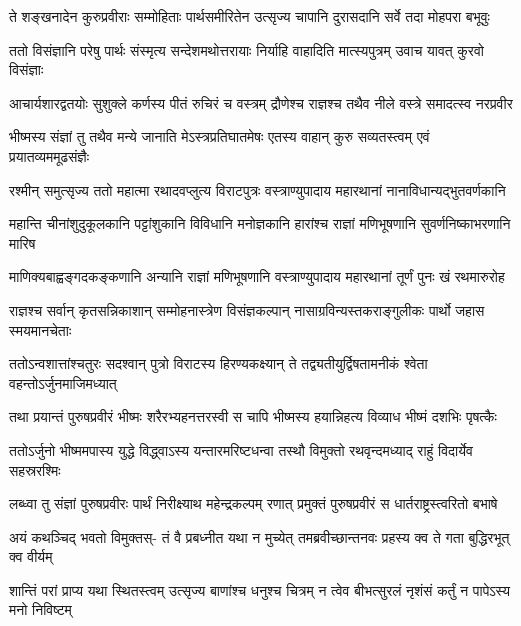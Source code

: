 \fourlineindentedshloka
{ते शङ्खनादेन कुरुप्रवीराः}
{सम्मोहिताः पार्थसमीरितेन}
{उत्सृज्य चापानि दुरासदानि}
{सर्वे तदा मोहपरा बभूवुः}


\fourlineindentedshloka
{ततो विसंज्ञानि परेषु पार्थः}
{संस्मृत्य सन्देशमथोत्तरायाः}
{निर्याहि वाहादिति मात्स्यपुत्रम्}
{उवाच यावत् कुरवो विसंज्ञाः}


\fourlineindentedshloka
{आचार्यशारद्वतयोः सुशुक्ले}
{कर्णस्य पीतं रुचिरं च वस्त्रम्}
{द्रौणेश्च राज्ञश्च तथैव नीले}
{वस्त्रे समादत्स्व नरप्रवीर}


\fourlineindentedshloka
{भीष्मस्य संज्ञां तु तथैव मन्ये}
{जानाति मेऽस्त्रप्रतिघातमेषः}
{एतस्य वाहान् कुरु सव्यतस्त्वम्}
{एवं प्रयातव्यममूढसंज्ञैः}


\fourlineindentedshloka
{रश्मीन् समुत्सृज्य ततो महात्मा}
{रथादवप्लुत्य विराटपुत्रः}
{वस्त्राण्युपादाय महारथानां}
{नानाविधान्यद्भुतवर्णकानि}


\fourlineindentedshloka
{महान्ति चीनांशुदुकूलकानि}
{पट्टांशुकानि विविधानि मनोज्ञकानि}
{हारांश्च राज्ञां मणिभूषणानि}
{सुवर्णनिष्काभरणानि मारिष}


\fourlineindentedshloka
{माणिक्यबाह्वङ्गदकङ्कणानि}
{अन्यानि राज्ञां मणिभूषणानि}
{वस्त्राण्युपादाय महारथानां}
{तूर्णं पुनः खं रथमारुरोह}


\fourlineindentedshloka
{राज्ञश्च सर्वान् कृतसन्निकाशान्}
{सम्मोहनास्त्रेण विसंज्ञकल्पान्}
{नासाग्रविन्यस्तकराङ्गुलीकः}
{पार्थो जहास स्मयमानचेताः}


\fourlineindentedshloka
{ततोऽन्वशात्तांश्चतुरः सदश्वान्}
{पुत्रो विराटस्य हिरण्यकक्ष्यान्}
{ते तद्व्यतीयुर्द्विषतामनीकं}
{श्वेता वहन्तोऽर्जुनमाजिमध्यात्}


\fourlineindentedshloka
{तथा प्रयान्तं पुरुषप्रवीरं}
{भीष्मः शरैरभ्यहनत्तरस्वी}
{स चापि भीष्मस्य हयान्निहत्य}
{विव्याध भीष्मं दशभिः पृषत्कैः}


\fourlineindentedshloka
{ततोऽर्जुनो भीष्ममपास्य युद्धे}
{विद्ध्वाऽस्य यन्तारमरिष्टधन्वा}
{तस्थौ विमुक्तो रथवृन्दमध्याद्}
{राहुं विदार्येव सहस्ररश्मिः}


\fourlineindentedshloka
{लब्ध्वा तु संज्ञां पुरुषप्रवीरः}
{पार्थं निरीक्ष्याथ महेन्द्रकल्पम्}
{रणात् प्रमुक्तं पुरुषप्रवीरं}
{स धार्तराष्ट्रस्त्वरितो बभाषे}


\fourlineindentedshloka
{अयं कथञ्चिद् भवतो विमुक्तस्-}
{तं वै प्रबध्नीत यथा न मुच्येत्}
{तमब्रवीच्छान्तनवः प्रहस्य}
{क्व ते गता बुद्धिरभूत् क्व वीर्यम्}


\fourlineindentedshloka
{शान्तिं परां प्राप्य यथा स्थितस्त्वम्}
{उत्सृज्य बाणांश्च धनुश्च चित्रम्}
{न त्वेव बीभत्सुरलं नृशंसं}
{कर्तुं न पापेऽस्य मनो निविष्टम्}


